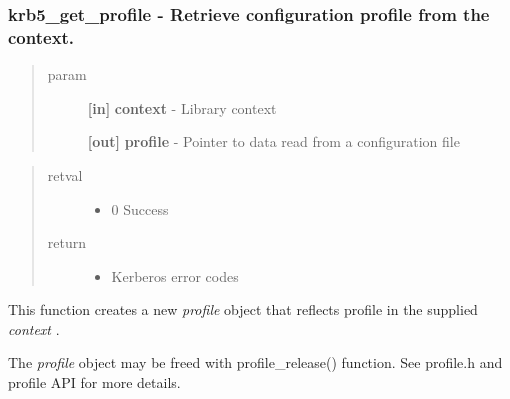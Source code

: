 \documentclass[letterpaper,10pt,english]{sphinxmanual}
\begin{document}
\subsubsection{krb5\_get\_profile -  Retrieve configuration profile from the context.}
\label{appdev/refs/api/krb5_get_profile::doc}\label{appdev/refs/api/krb5_get_profile:krb5-get-profile-retrieve-configuration-profile-from-the-context}

\begin{fulllineitems}
\label{appdev/refs/api/krb5_get_profile:c.krb5_get_profile}
\end{fulllineitems}

\begin{quote}\begin{description}
\item[{param}] \leavevmode
\textbf{{[}in{]}} \textbf{context} - Library context

\textbf{{[}out{]}} \textbf{profile} - Pointer to data read from a configuration file

\end{description}\end{quote}
\begin{quote}\begin{description}
\item[{retval}] \leavevmode\begin{itemize}
\item {} 
0   Success

\end{itemize}

\item[{return}] \leavevmode\begin{itemize}
\item {} 
Kerberos error codes

\end{itemize}

\end{description}\end{quote}

This function creates a new \emph{profile} object that reflects profile in the supplied \emph{context} .

The \emph{profile} object may be freed with profile\_release() function. See profile.h and profile API for more details.
\end{document}
